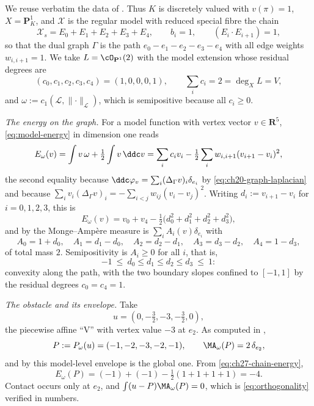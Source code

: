 \begin{example}
\label{ex:ch27-curve-derivative}
We reuse verbatim the data of .  Thus
\(K\) is discretely valued with \(v(\pi)=1\), \(X=\mathbf P^1_K\), and
\(\mathcal X\) is the regular model with reduced special fibre the chain
\[
 \mathcal X_s=E_0+E_1+E_2+E_3+E_4,
 \qquad b_i=1,\qquad (E_i\cdot E_{i+1})=1,
\]
so that the dual graph \(\Gamma\) is the path
\(e_0-e_1-e_2-e_3-e_4\) with all edge weights \(w_{i,i+1}=1\).  We take
\(L=\cO_{\mathbf P^1}(2)\) with the model extension whose residual degrees
are
\[
 (c_0,c_1,c_2,c_3,c_4)=(1,0,0,0,1),
 \qquad \sum_ic_i=2=\deg_XL=V,
\]
and \(\omega:=c_1(\mathcal L,\lVert\cdot\rVert_{\mathcal L})\), which is
semipositive because all \(c_i\geq0\).

\emph{The energy on the graph.}  For a model function with vertex vector
\(v\in\mathbf R^5\), \eqref{eq:model-energy} in dimension one reads
\[
 E_\omega(v)=\int v\,\omega+\tfrac12\int v\,\ddc v
 =\sum_ic_iv_i-\tfrac12\sum_{i}w_{i,i+1}(v_{i+1}-v_i)^2 ,
\]
the second equality because
\(\ddc\varphi_v=\sum_i(\Delta_\Gamma v)_i\delta_{e_i}\) by
\eqref{eq:ch20-graph-laplacian} and because
\(\sum_iv_i(\Delta_\Gamma v)_i=-\sum_{i<j}w_{ij}(v_i-v_j)^2\).  Writing
\(d_i:=v_{i+1}-v_i\) for \(i=0,1,2,3\), this is
\begin{equation}\label{eq:ch27-chain-energy}
 E_\omega(v)=v_0+v_4-\tfrac12\bigl(d_0^2+d_1^2+d_2^2+d_3^2\bigr),
\end{equation}
and by  the Monge--Amp\`ere measure is
\(\sum_iA_i(v)\delta_{e_i}\) with
\begin{equation}\label{eq:ch27-chain-A}
 A_0=1+d_0,\quad A_1=d_1-d_0,\quad A_2=d_2-d_1,\quad A_3=d_3-d_2,
 \quad A_4=1-d_3,
\end{equation}
of total mass \(2\).  Semipositivity is \(A_i\geq0\) for all \(i\), that is,
\begin{equation}\label{eq:ch27-chain-slope-window}
 -1\ \leq\ d_0\leq d_1\leq d_2\leq d_3\ \leq\ 1 :
\end{equation}
convexity along the path, with the two boundary slopes confined to
\([-1,1]\) by the residual degrees \(c_0=c_4=1\).

\emph{The obstacle and its envelope.}  Take
\[
 u=(0,-\tfrac32,-3,-\tfrac32,0),
\]
the piecewise affine ``V'' with vertex value \(-3\) at \(e_2\).  As computed
in ,
\[
 P:=P_\omega(u)=(-1,-2,-3,-2,-1),
 \qquad
 \MA_\omega(P)=2\,\delta_{e_2},
\]
and by  this model-level envelope is the
global one.  From \eqref{eq:ch27-chain-energy},
\[
 E_\omega(P)=(-1)+(-1)-\tfrac12(1+1+1+1)=-4 .
\]
Contact occurs only at \(e_2\), and \(\int(u-P)\MA_\omega(P)=0\), which is
\eqref{eq:orthogonality} verified in numbers.


\end{example}
